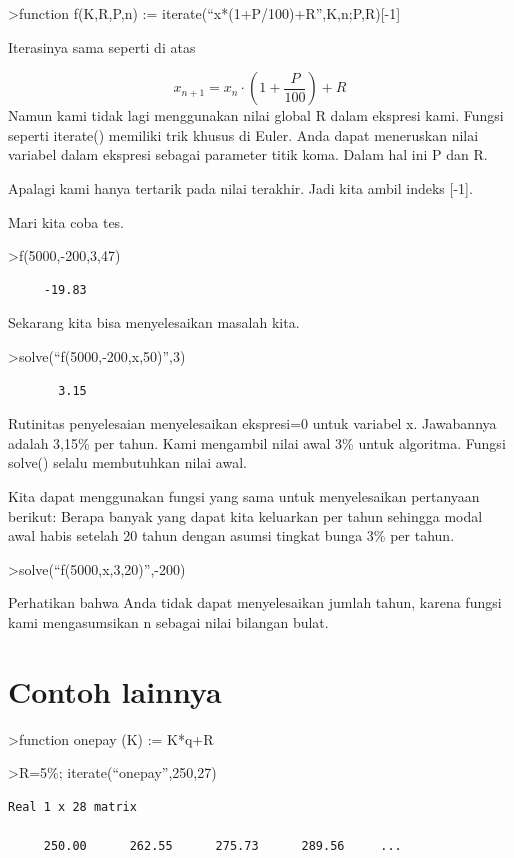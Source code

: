 \documentclass[
]{book}
\begin{document}
\textgreater function f(K,R,P,n) := iterate(``x*(1+P/100)+R'',K,n;P,R){[}-1{]}

Iterasinya sama seperti di atas

\[x_{n+1} = x_n \cdot \left(1+ \frac{P}{100}\right) + R\]Namun kami tidak lagi menggunakan nilai global R dalam ekspresi kami. Fungsi seperti iterate() memiliki trik khusus di Euler. Anda dapat meneruskan nilai variabel dalam ekspresi sebagai parameter titik koma. Dalam hal ini P dan R.

Apalagi kami hanya tertarik pada nilai terakhir. Jadi kita ambil indeks {[}-1{]}.

Mari kita coba tes.

\textgreater f(5000,-200,3,47)

\begin{verbatim}
     -19.83 
\end{verbatim}

Sekarang kita bisa menyelesaikan masalah kita.

\textgreater solve(``f(5000,-200,x,50)'',3)

\begin{verbatim}
       3.15 
\end{verbatim}

Rutinitas penyelesaian menyelesaikan ekspresi=0 untuk variabel x. Jawabannya adalah 3,15\% per tahun. Kami mengambil nilai awal 3\% untuk algoritma. Fungsi solve() selalu membutuhkan nilai awal.

Kita dapat menggunakan fungsi yang sama untuk menyelesaikan pertanyaan berikut: Berapa banyak yang dapat kita keluarkan per tahun sehingga modal awal habis setelah 20 tahun dengan asumsi tingkat bunga 3\% per tahun.

\textgreater solve(``f(5000,x,3,20)'',-200)

Perhatikan bahwa Anda tidak dapat menyelesaikan jumlah tahun, karena fungsi kami mengasumsikan n sebagai nilai bilangan bulat.

\chapter{Contoh lainnya}\label{contoh-lainnya-17}

\textgreater function onepay (K) := K*q+R

\textgreater R=5\%; iterate(``onepay'',250,27)

\begin{verbatim}
Real 1 x 28 matrix

     250.00      262.55      275.73      289.56     ...
\end{verbatim}
\end{document}
